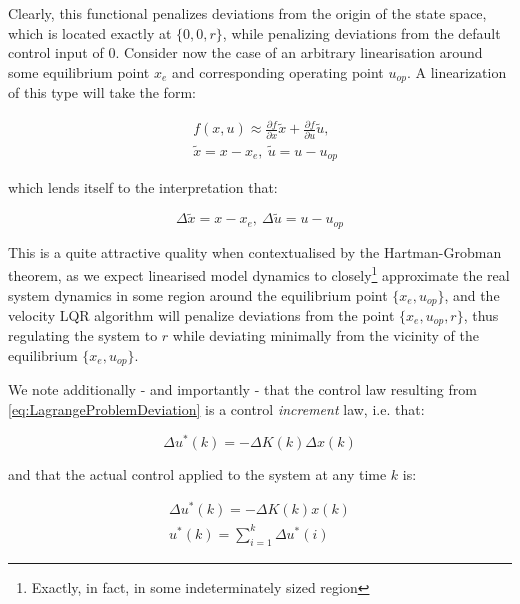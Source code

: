 Clearly, this functional penalizes deviations from the origin of the state space, which is located exactly at $\{0,0,r\}$, while penalizing deviations from the default control input of $0$. Consider now the case of an arbitrary linearisation around some equilibrium point $x_{e}$ and corresponding operating point $u_{op}$. A linearization of this type will take the form:

\begin{equation}\label{eq:LinearizationAroundOP}
	\begin{split}
	&f(x,u) \approx \frac{\partial f}{\partial x} \tilde{x} + \frac{\partial f}{\partial u} \tilde{u}, \\ 
	&\tilde{x} = x-x_e, \ \tilde{u} = u - u_{op}
	\end{split}
\end{equation}

which lends itself to the interpretation that:

\begin{equation}\label{eq:DeltaInterpretation}
	\Delta \tilde{x} = x-x_e, \ \Delta \tilde{u} = u-u_{op}
\end{equation}

\clearpage

This is a quite attractive quality when contextualised by the Hartman-Grobman theorem, as we expect linearised model dynamics to closely\footnote{Exactly, in fact, in some indeterminately sized region} approximate the real system dynamics in some region around the equilibrium point $\{x_e,u_{op}\}$, and the velocity LQR algorithm will penalize deviations from the point $\{x_e,u_{op},r\}$, thus regulating the system to $r$ while deviating minimally from the vicinity of the equilibrium $\{x_e,u_{op}\}$.

We note additionally - and importantly - that the control law resulting from \cref{eq:LagrangeProblemDeviation} is a control \textit{increment} law, i.e. that:

\begin{equation}\label{eq:ControlIncrementLaw}
	\Delta u^*(k) = -\Delta K(k) \Delta x(k) 
\end{equation}

and that the actual control applied to the system at any time $k$ is:

\begin{equation}\label{eq:ActualControlApplied}
	\begin{gathered}
		\Delta u^*(k) = -\Delta K(k)x(k) \\
		u^*(k) = \sum_{i=1}^{k} \Delta u^*(i)
	\end{gathered}
\end{equation}

